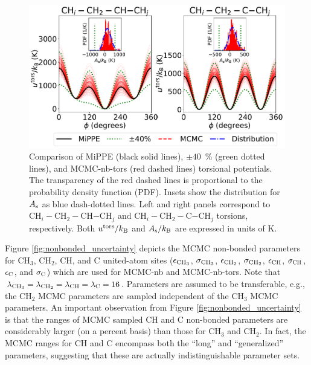 \documentclass[preprint,review,12pt]{elsarticle}
\begin{document}
	
	\begin{figure}[htb!]
		\centering
		\includegraphics[width=6.4in]{MCMC_torsions.pdf}
		\caption{Comparison of MiPPE (black solid lines), $\pm 40$~\% (green dotted lines), and MCMC-nb-tors (red dashed lines) torsional potentials. The transparency of the red dashed lines is proportional to the probability density function (PDF). Insets show the distribution for $A_{\rm s}$ as blue dash-dotted lines. Left and right panels correspond to CH$_i-$CH$_2-$CH$-$CH$_j$ and CH$_i-$CH$_2-$C$-$CH$_j$ torsions, respectively. Both $u^{\rm tors}/k_{\rm B}$ and $A_{\rm s}/k_{\rm B}$ are expressed in units of K.}
		\label{fig:dihedral_uncertainty}
	\end{figure}

	Figure \ref{fig:nonbonded_uncertainty} depicts the MCMC non-bonded parameters for CH$_3$, CH$_2$, CH, and C united-atom sites ($\epsilon_{\rm CH_3}$, $\sigma_{\rm CH_3}$, $\epsilon_{\rm CH_2}$, $\sigma_{\rm CH_2}$, $\epsilon_{\rm CH}$, $\sigma_{\rm CH}$, $\epsilon_{\rm C}$, and $\sigma_{\rm C}$) which are used for MCMC-nb and MCMC-nb-tors. Note that $\lambda_{\rm CH_3} = \lambda_{\rm CH_2} = \lambda_{\rm CH} = \lambda_{\rm C} = 16$. Parameters are assumed to be transferable, e.g., the CH$_2$ MCMC parameters are sampled independent of the CH$_3$ MCMC parameters. An important observation from Figure \ref{fig:nonbonded_uncertainty} is that the ranges of MCMC sampled CH and C non-bonded parameters are considerably larger (on a percent basis) than those for CH$_3$ and CH$_2$. In fact, the MCMC ranges for CH and C encompass both the ``long'' and ``generalized'' parameters, suggesting that these are actually indistinguishable parameter sets.
	
\end{document}
